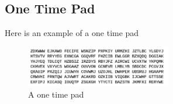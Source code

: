 \subsection{One Time Pad}
Here is an example of a one time pad
\begin{figure}[h]
\centering
\includegraphics[width=2.5in]{otp.png}
\caption{A one time pad}
\end{figure}
